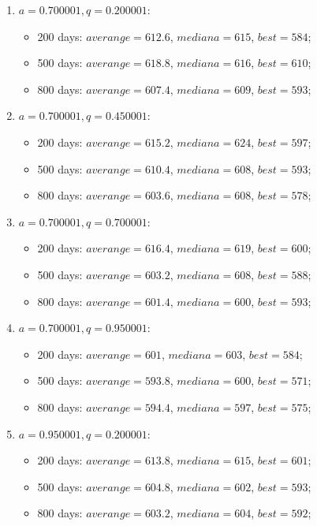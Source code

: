 \begin{enumerate}
\begin{enumerate}
\begin{itemize}
		\end{itemize}
		\item $a= 0.700001, q= 0.200001$:
		\begin{itemize}
			\item 200 days: $averange = 612.6$, $mediana = 615$, $best = 584$;
			\item 500 days: $averange = 618.8$, $mediana = 616$, $best = 610$;
			\item 800 days: $averange = 607.4$, $mediana = 609$, $best = 593$;
		\end{itemize}
		\item $a= 0.700001, q= 0.450001$:
		\begin{itemize}
			\item 200 days: $averange = 615.2$, $mediana = 624$, $best = 597$;
			\item 500 days: $averange = 610.4$, $mediana = 608$, $best = 593$;
			\item 800 days: $averange = 603.6$, $mediana = 608$, $best = 578$;
		\end{itemize}
		\item $a= 0.700001, q= 0.700001$:
		\begin{itemize}
			\item 200 days: $averange = 616.4$, $mediana = 619$, $best = 600$;
			\item 500 days: $averange = 603.2$, $mediana = 608$, $best = 588$;
			\item 800 days: $averange = 601.4$, $mediana = 600$, $best = 593$;
		\end{itemize}
		\item $a= 0.700001, q= 0.950001$:
		\begin{itemize}
			\item 200 days: $averange = 601$, $mediana = 603$, $best = 584$;
			\item 500 days: $averange = 593.8$, $mediana = 600$, $best = 571$;
			\item 800 days: $averange = 594.4$, $mediana = 597$, $best = 575$;
		\end{itemize}
		\item $a= 0.950001, q= 0.200001$:
		\begin{itemize}
			\item 200 days: $averange = 613.8$, $mediana = 615$, $best = 601$;
			\item 500 days: $averange = 604.8$, $mediana = 602$, $best = 593$;
			\item 800 days: $averange = 603.2$, $mediana = 604$, $best = 592$;
		\end{itemize}

\end{enumerate}
\end{enumerate}
